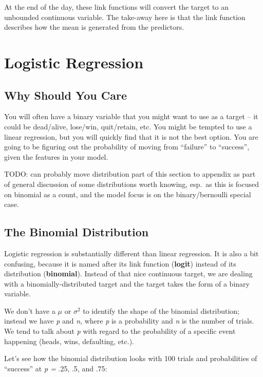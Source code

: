 \documentclass[
  letterpaper,
]{krantz}
\begin{document}
At the end of the day, these link functions will convert the target to
an unbounded continuous variable. The take-away here is that the link
function describes how the mean is generated from the predictors.

\section{Logistic Regression}\label{sec-glm-logistic}

\subsection{Why Should You Care}\label{sec-glm-logistic-why}

You will often have a binary variable that you might want to use as a
target -- it could be dead/alive, lose/win, quit/retain, etc. You might
be tempted to use a linear regression, but you will quickly find that it
is not the best option. You are going to be figuring out the probability
of moving from ``failure'' to ``success'', given the features in your
model.

TODO: can probably move distribution part of this section to appendix as
part of general discussion of some distributions worth knowing, esp.~as
this is focused on binomial as a count, and the model focus is on the
binary/bernoulli special case.

\subsection{The Binomial Distribution}\label{sec-glm-binomial}

Logistic regression is substantially different than linear regression.
It is also a bit confusing, because it is named after its link function
(\textbf{logit}) instead of its distribution (\textbf{binomial}).
Instead of that nice continuous target, we are dealing with a
binomially-distributed target and the target takes the form of a binary
variable.

We don't have a \(\mu\) or \(\sigma^2\) to identify the shape of the
binomial distribution; instead we have \emph{p} and \emph{n}, where
\emph{p} is a probability and \emph{n} is the number of trials. We tend
to talk about \emph{p} with regard to the probability of a specific
event happening (heads, wins, defaulting, etc.).

Let's see how the binomial distribution looks with 100 trials and
probabilities of ``success'' at \emph{p = } .25, .5, and .75:
\end{document}
